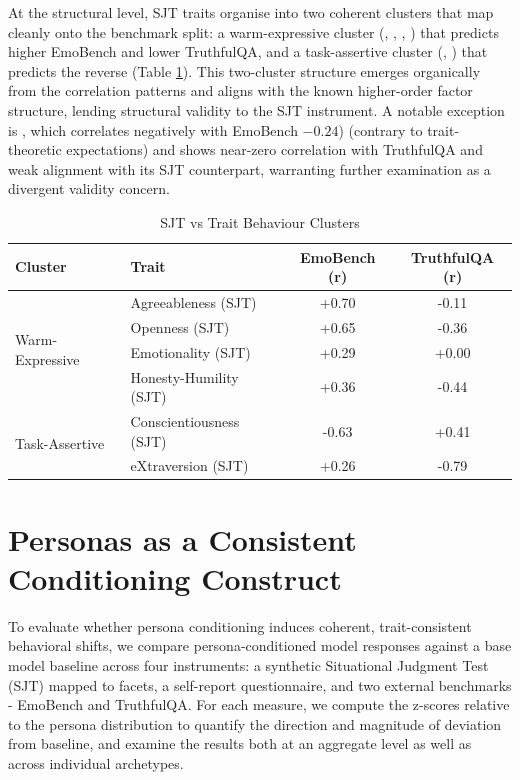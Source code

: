 At the structural level, SJT traits organise into two coherent clusters that map cleanly onto the benchmark split: a warm-expressive cluster (\agreeableness\;, \openness\;, \emotionality\;, \honestyhumility\;) that predicts higher EmoBench and lower TruthfulQA, and a task-assertive cluster (\conscientiousness\;, \extraversion\;) that predicts the reverse (Table \ref{tab:cluster_sjt_trait}). This two-cluster structure emerges organically from the correlation patterns and aligns with the known \hexaco\; higher-order factor structure, lending structural validity to the SJT instrument. A notable exception is \hexaco\; \extraversion\;, which correlates negatively with EmoBench $-0.24$) (contrary to trait-theoretic expectations) and shows near-zero correlation with TruthfulQA and weak alignment with its SJT counterpart, warranting further examination as a divergent validity concern.


\begin{table}[H]
\centering
\caption{SJT vs Trait Behaviour Clusters}
\label{tab:cluster_sjt_trait}
\begin{tabularx}{\columnwidth}{|X|X|c|c|}
\hline
\textbf{Cluster} & \textbf{Trait} & \textbf{EmoBench (r)} & \textbf{TruthfulQA (r)} \\
\hline
\multirow{4}{*}{Warm-Expressive}
& Agreeableness (SJT)     & +0.70 & -0.11 \\
& Openness (SJT)          & +0.65 & -0.36 \\
& Emotionality (SJT)      & +0.29 & +0.00 \\
& Honesty-Humility (SJT)  & +0.36 & -0.44 \\
\hline
\multirow{2}{*}{Task-Assertive}
& Conscientiousness (SJT) & -0.63 & +0.41 \\
& eXtraversion (SJT)      & +0.26 & -0.79 \\
\hline
\end{tabularx}
\end{table}



\section{Personas as a Consistent Conditioning Construct}
\label{app:persona_consistent_construct}

To evaluate whether persona conditioning induces coherent, trait-consistent behavioral shifts, we compare persona-conditioned model responses against a base model baseline across four instruments: a synthetic Situational Judgment Test (SJT) mapped to \hexaco\; facets, a self-report \hexaco\; questionnaire, and two external benchmarks - EmoBench and TruthfulQA. For each measure, we compute the z-scores relative to the persona distribution to quantify the direction and magnitude of deviation from baseline, and examine the results both at an aggregate level as well as across individual archetypes.

